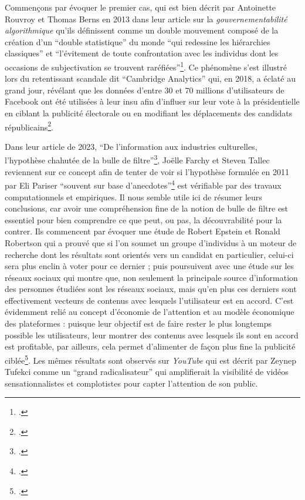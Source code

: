 Commençons par évoquer le premier cas, qui est bien décrit par Antoinette Rouvroy et Thomas Berns en 2013 dans leur article sur la \textit{gouvernementabilité algorithmique} qu’ils définissent comme un double mouvement composé de la création d’un \enquote{double statistique} du monde \enquote{qui redessine les hiérarchies classiques} et \enquote{l’évitement de toute confrontation avec les individus dont les occasions de subjectivation se trouvent raréfiées}\footcite{rouvroy_gouvernementalite_2013}. Ce phénomène s’est illustré lors du retentissant scandale dit \enquote{Cambridge Analytics} qui, en 2018, a éclaté au grand jour, révélant que les données d’entre 30 et 70 millions d’utilisateurs de Facebook ont été utilisées à leur insu afin d’influer sur leur vote à la présidentielle en ciblant la publicité électorale ou en modifiant les déplacements des candidats républicains\footcite{noauthor_ce_2018}.

Dans leur article de 2023, \enquote{De l’information aux industries culturelles, l’hypothèse chahutée de la bulle de filtre}\footcite{farchy_linformation_2023}, Joëlle Farchy et Steven Tallec reviennent sur ce concept afin de tenter de voir si l’hypothèse formulée en 2011 par Eli Pariser \enquote{souvent sur base d’anecdotes}\footcite[§ 5]{farchy_linformation_2023} est vérifiable par des travaux computationnels et empiriques. Il nous semble utile ici de résumer leurs conclusions, car avoir une compréhension fine de la notion de bulle de filtre est essentiel pour bien comprendre ce que peut, ou pas, la découvrabilité pour la contrer. Ils commencent par évoquer une étude de Robert Epstein et Ronald Robertson qui a prouvé que si l’on soumet un groupe d’individus à un moteur de recherche dont les résultats sont orientés vers un candidat en particulier, celui-ci sera plus enclin à voter pour ce dernier ; puis poursuivent avec une étude sur les réseaux sociaux qui montre que, non seulement la principale source d’information des personnes étudiées sont les réseaux sociaux, mais qu’en plus ces derniers sont effectivement vecteurs de contenus avec lesquels l’utilisateur est en accord. C’est évidemment relié au concept d’économie de l’attention et au modèle économique des plateformes : puisque leur objectif est de faire rester le plus longtemps possible les utilisateurs, leur montrer des contenus avec lesquels ils sont en accord est profitable, par ailleurs, cela permet d’alimenter de façon plus fine la publicité ciblée\footcite{noauthor_bulles_nodate}. Les mêmes résultats sont observés sur \textit{YouTube} qui est décrit par Zeynep Tufekci comme un \enquote{grand radicalisateur} qui amplifierait la visibilité de vidéos sensationnalistes et complotistes pour capter l’attention de son public.


